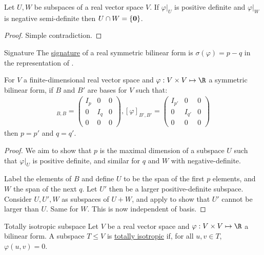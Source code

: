 \documentclass[../Main.tex]{subfiles}
\begin{document}
\begin{lemma}
    Let $U, W$ be subspaces of a real vector space $V$. If $\varphi|_U$ is positive definite and $\varphi|_W$ is negative semi-definite then $U \cap W = \{\boldsymbol{0}\}$.
    \label{lemDefiniteIntersections}
\end{lemma}
\begin{proof}
    Simple contradiction.
\end{proof}
\begin{definition}{Signature}
    The \underline{signature} of a real symmetric bilinear form is $\sigma(\varphi) = p - q$ in the representation of .
\end{definition}
\begin{theorem}
    For $V$ a finite-dimensional real vector space and $\varphi : V \times V \mapsto \R$ a symmetric bilinear form, if $B$ and $B'$ are bases for $V$ such that:
    \begin{align*}
        [\varphi]_{B, B} =
        \begin{pmatrix}
            I_p & 0 & 0 \\
            0 & I_q & 0 \\
            0 & 0 & 0
        \end{pmatrix}
        , [\varphi]_{B', B'} =
        \begin{pmatrix}
            I_{p'} & 0 & 0 \\
            0 & I_{q'} & 0 \\
            0 & 0 & 0
        \end{pmatrix}
    \end{align*}
    then $p = p'$ and $q = q'$.
    \label{thmSylvesterInertia}
\end{theorem}
\begin{proof}
    We aim to show that $p$ is the maximal dimension of a subspace $U$ such that $\varphi|_U$ is positive definite, and similar for $q$ and $W$ with negative-definite.

    Label the elements of $B$ and define $U$ to be the span of the first $p$ elements, and $W$ the span of the next $q$. Let $U'$ then be a larger positive-definite subspace. Consider $U, U', W$ as subspaces of $U + W$, and apply  to show that $U'$ cannot be larger than $U$. Same for $W$. This is now independent of basis.
\end{proof}
\begin{definition}{Totally isotropic subspace}
    Let $V$ be a real vector space and $\varphi : V \times V \mapsto \R$ a bilinear form. A subspace $T \leq V$ is \underline{totally isotropic} if, for all $u, v \in T$, $\varphi(u, v) = 0$.
\end{definition}
\end{document}
